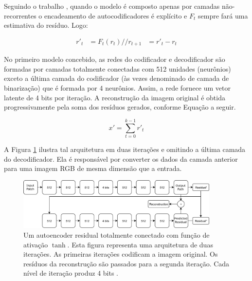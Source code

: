 Seguindo o trabalho \cite{Variable2016Toderici}, quando o modelo é composto apenas por camadas não-recorrentes o encadeamento de autocodificadores é explícito e $F_t$ sempre fará uma estimativa do resíduo. Logo:


\begin{equation}
\label{eq:reconst_escalar}
\begin{aligned}
r'_{t}  &= F_t(r_{t}) //
r_{t+1} &= r'_{t} - r_{t}
\end{aligned}
\end{equation}

No primeiro modelo concebido, as redes do codificador e decodificador são formadas por camadas totalmente conectadas com 512 unidades (neurônios) exceto a última camada do codificador (às vezes denominado de camada de binarização) que é formada por 4 neurônios. Assim, a rede fornece um vetor latente de 4 bits por iteração. A reconstrução da imagem original é obtida progressivamente pela soma dos resíduos gerados, conforme Equação a seguir.

\begin{equation}
x' = \sum_{t=0}^{k-1} r'_{t}
\end{equation}


A Figura  \ref{fig:toderici1} ilustra tal arquitetura em duas iterações e omitindo a última camada do decodificador. Ela é responsável por converter os dados da camada anterior para uma imagem RGB de mesma dimensão que a entrada.




\begin{figure}[h]
	\centering
	\includegraphics[width=0.90\textwidth]{figuras/toderici_1.pdf}
	\caption{Um autoencoder residual totalmente conectado com  função de ativação $\tanh$. Esta figura representa uma arquitetura de duas iterações. As primeiras iterações codificam a imagem original. Os resíduos da reconstrução são passados para a segunda iteração. Cada nível de iteração produz 4 bits \cite{Variable2016Toderici}.}
	\label{fig:toderici1}
\end{figure}


